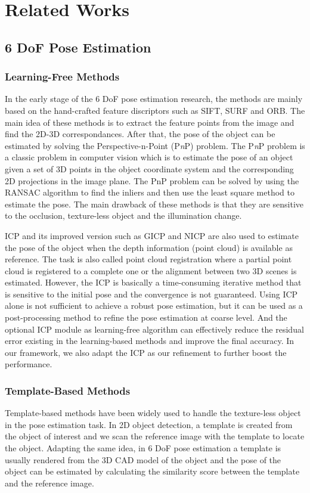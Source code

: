 \documentclass[12pt,DIV14,BCOR12mm,a4paper,footinclude=false,headinclude,parskip=half-,twoside,openright,cleardoublepage=empty,toc=index,bibliography=totoc,listof=totoc]{scrreprt}
\numberwithin{equation}{chapter}
\begin{document}
\chapter{Related Works}
\section{6 DoF Pose Estimation}
\subsection{Learning-Free Methods}
In the early stage of the 6 DoF pose estimation research, the methods are mainly based on the hand-crafted feature discriptors such as SIFT\cite{sift}, SURF\cite{surf} and ORB\cite{6126544}. The main idea of these methods is to extract the feature points from the image and find the 2D-3D correspondances. After that, the pose of the object can be estimated by solving the Perspective-n-Point (P\textit{n}P) problem. The P\textit{n}P problem is a classic problem in computer vision which is to estimate the pose of an object given a set of 3D points in the object coordinate system and the corresponding 2D projections in the image plane. The PnP problem can be solved by using the RANSAC\cite{10.1145/358669.358692} algorithm to find the inliers and then use the least square method to estimate the pose. The main drawback of these methods is that they are sensitive to the occlusion, texture-less object and the illumination change. 

ICP \cite{Besl1992AMF} and its improved version such as GICP\cite{gicp} and NICP\cite{nicp} are also used to estimate the pose of the object when the depth information (point cloud) is available as reference. The task is also called point cloud registration where a partial point cloud is registered to a complete one or the alignment between two 3D scenes is estimated. However, the ICP is basically a time-consuming iterative method that is sensitive to the initial pose and the convergence is not guaranteed. Using ICP alone is not sufficient to achieve a robust pose estimation, but it can be used as a post-processing method to refine the pose estimation at coarse level. And the optional ICP module as learning-free algorithm can effectively reduce the residual error existing in the learning-based methods and improve the final accuracy. In our framework, we also adapt the ICP as our refinement to further boost the performance.
\subsection{Template-Based Methods}
Template-based methods have been widely used to handle the texture-less object in the pose estimation task. In 2D object detection, a template is created from the object of interest and we scan the reference image with the template to locate the object. Adapting the same idea, in 6 DoF pose estimation a template is usually rendered from the 3D CAD model of the object and the pose of the object can be estimated by calculating the similarity score between the template and the reference image. 
\end{document}

